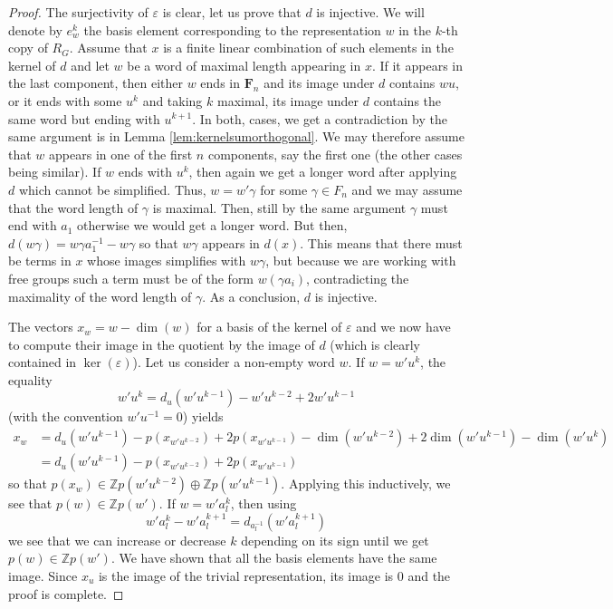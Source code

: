 \documentclass[a4paper, 11pt]{amsart}
\theoremstyle{plain}
\theoremstyle{definition}
\theoremstyle{remark}
\newcommand{\F}{\mathbf{F}}
\newcommand{\Z}{\mathbb{Z}}
\begin{document}
\begin{proof}
The surjectivity of $\varepsilon$ is clear, let us prove that $d$ is injective. We will denote by $e_{w}^{k}$ the basis element corresponding to the representation $w$ in the $k$-th copy of $R_{G}$. Assume that $x$ is a finite linear combination of such elements in the kernel of $d$ and let $w$ be a word of maximal length appearing in $x$. If it appears in the last component, then either $w$ ends in $\F_{n}$ and its image under $d$ contains $wu$, or it ends with some $u^{k}$ and taking $k$ maximal, its image under $d$ contains the same word but ending with $u^{k+1}$. In both, cases, we get a contradiction by the same argument is in Lemma \ref{lem:kernelsumorthogonal}. We may therefore assume that $w$ appears in one of the first $n$ components, say the first one (the other cases being similar). If $w$ ends with $u^{k}$, then again we get a longer word after applying $d$ which cannot be simplified. Thus, $w = w'\gamma$ for some $\gamma\in F_{n}$ and we may assume that the word length of $\gamma$ is maximal. Then, still by the same argument $\gamma$ must end with $a_{1}$ otherwise we would get a longer word. But then, $d(w\gamma) = w\gamma a_{1}^{-1} - w\gamma$ so that $w\gamma$ appears in $d(x)$. This means that there must be terms in $x$ whose images simplifies with $w\gamma$, but because we are working with free groups such a term must be of the form $w(\gamma a_{i})$, contradicting the maximality of the word length of $\gamma$. As a conclusion, $d$ is injective.

The vectors $x_{w} = w - \dim(w)$ for a basis of the kernel of $\varepsilon$ and we now have to compute their image in the quotient by the image of $d$ (which is clearly contained in $\ker(\varepsilon)$). Let us consider a non-empty word $w$. If $w = w'u^{k}$, the equality
\begin{equation*}
w'u^{k} = d_{u}(w'u^{k-1}) - w'u^{k-2} + 2w'u^{k-1}
\end{equation*}
(with the convention $w'u^{-1} = 0$) yields
\begin{align*}
x_{w} & = d_{u}(w'u^{k-1}) - p(x_{w'u^{k-2}}) + 2p(x_{w'u^{k-1}}) - \dim(w'u^{k-2}) + 2\dim(w'u^{k-1}) - \dim(w'u^{k}) \\
& = d_{u}(w'u^{k-1}) - p(x_{w'u^{k-2}}) + 2p(x_{w'u^{k-1}})
\end{align*}
so that $p(x_{w}) \in \Z p(w'u^{k-2})\oplus\Z p(w'u^{k-1})$. Applying this inductively, we see that $p(w)\in \Z p(w')$. If $w = w'a_{l}^{k}$, then using
\begin{equation*}
w'a_{l}^{k} - w'a_{l}^{k+1} = d_{a_{l}^{-1}}(w'a_{l}^{k+1})
\end{equation*}
we see that we can increase or decrease $k$ depending on its sign until we get $p(w)\in \Z p(w')$. We have shown that all the basis elements have the same image. Since $x_{u}$ is the image of the trivial representation, its image is $0$ and the proof is complete.
\end{proof}
\end{document}
